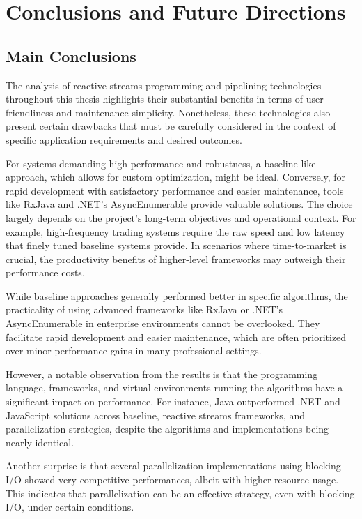 \hfill
\chapter{Conclusions and Future Directions}

\section{Main Conclusions}

The analysis of reactive streams programming and pipelining technologies throughout this thesis highlights their substantial benefits in terms of user-friendliness and maintenance simplicity. Nonetheless, these technologies also present certain drawbacks that must be carefully considered in the context of specific application requirements and desired outcomes.

For systems demanding high performance and robustness, a baseline-like approach, which allows for custom optimization, might be ideal. Conversely, for rapid development with satisfactory performance and easier maintenance, tools like RxJava and .NET's AsyncEnumerable provide valuable solutions. The choice largely depends on the project's long-term objectives and operational context. For example, high-frequency trading systems require the raw speed and low latency that finely tuned baseline systems provide. In scenarios where time-to-market is crucial, the productivity benefits of higher-level frameworks may outweigh their performance costs.

While baseline approaches generally performed better in specific algorithms, the practicality of using advanced frameworks like RxJava or .NET's AsyncEnumerable in enterprise environments cannot be overlooked. They facilitate rapid development and easier maintenance, which are often prioritized over minor performance gains in many professional settings.

However, a notable observation from the results is that the programming language, frameworks, and virtual environments running the algorithms have a significant impact on performance. For instance, Java outperformed .NET and JavaScript solutions across baseline, reactive streams frameworks, and parallelization strategies, despite the algorithms and implementations being nearly identical.

Another surprise is that several parallelization implementations using blocking I/O showed very competitive performances, albeit with higher resource usage. This indicates that parallelization can be an effective strategy, even with blocking I/O, under certain conditions.

